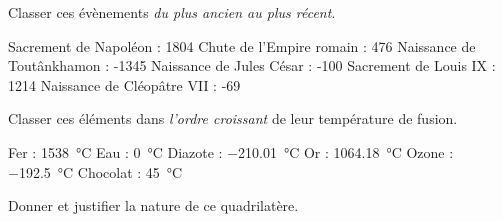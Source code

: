 \documentclass[../Cours.tex]{subfiles}
\begin{document}
\clearpage
\thispagestyle{empty}

\color{black}
\nomPrenom
\titreDS

\begin{questions}
    \question Classer ces évènements \textit{du plus ancien au plus récent}.
        \begin{multicols}{2}
        \subquestion Sacrement de Napoléon : 1804
        \subquestion Chute de l'Empire romain : 476
        \subquestion Naissance de Toutânkhamon : -1345
        \subquestion Naissance de Jules César : -100
        \subquestion Sacrement de Louis IX : 1214
        \subquestion Naissance de Cléopâtre VII : -69
        \end{multicols} 
    \question Classer ces éléments dans \textit{l'ordre croissant} de leur température de fusion.
        \begin{multicols}{3}
        \subquestion Fer : \qty{1538}{\degreeCelsius}
        \subquestion Eau : \qty{0}{\degreeCelsius}
        \subquestion Diazote : \qty{-210.01}{\degreeCelsius}
        \subquestion Or : \qty{1064.18}{\degreeCelsius}
        \subquestion Ozone : \qty{-192.5}{\degreeCelsius}
        \subquestion Chocolat : \qty{45}{\degreeCelsius}
        \end{multicols}

    \question Donner et justifier la nature de ce quadrilatère.

    \begin{centre}
    \end{centre}    


\end{questions}
\end{document}

